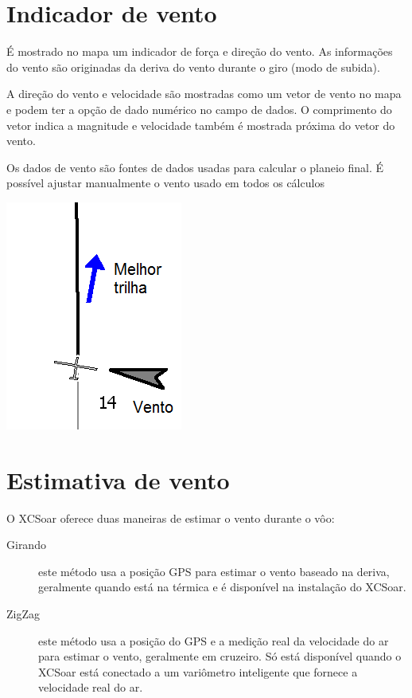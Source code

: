 \section{Indicador de vento}

É mostrado no mapa um indicador de força e direção do vento.  As informações do vento são originadas da deriva do vento durante o giro (modo de subida).

A direção do vento e velocidade são mostradas como um vetor de vento no mapa e podem ter a opção de dado numérico no campo de dados.  O comprimento do vetor indica a magnitude e velocidade também é mostrada próxima do vetor do vento. 

Os dados de vento são fontes de dados usadas para calcular o planeio final.  É possível ajustar manualmente o vento usado em todos os cálculos

\begin{center}
\includegraphics[angle=0,width=0.4\linewidth,keepaspectratio='true']{figures/optwind.png}


\end{center}

\section{Estimativa de vento }\label{sec:wind-estimation}

O XCSoar oferece duas maneiras de estimar o vento durante o vôo:
\begin{description}
\item[Girando]  este método usa a posição GPS para estimar o vento baseado na deriva, geralmente quando está na térmica e é disponível na instalação do XCSoar.
\item[ZigZag]  este método usa a posição do GPS e a medição real da velocidade do ar para estimar o vento, geralmente em cruzeiro.  Só está disponível quando o XCSoar está conectado a um variômetro inteligente que fornece a velocidade real do ar.
\end{description}

